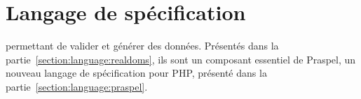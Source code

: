 \chapter{Langage de spécification}
\label{chapter:language}

\mminitoc

 permettant de valider
et générer des données. Présentés dans la
partie~\ref{section:language:realdoms}, ils sont un composant essentiel de
Praspel, un nouveau langage de spécification pour PHP, présenté dans la
partie~\ref{section:language:praspel}.

